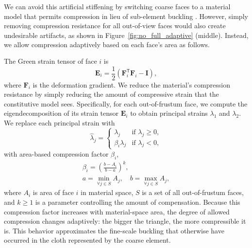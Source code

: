 \documentclass[10pt,journal,compsoc,twoside]{TexInputs/IEEEtran}
\begin{document}
We can avoid this artificial stiffening by switching coarse faces
to a material model that permits compression in lieu of sub-element buckling
\cite{Choi:2002:SBR,Wang:2010:MIS}.
However, simply removing compression resistance for all out-of-view faces would also create undesirable artifacts, as shown in Figure~\ref{fig:no_full_adaptive} (middle). Instead, we allow compression adaptively based on each face's
area as follows.

The Green strain tensor of face $i$ is
\begin{equation}
  \textbf{E}_i = \frac{1}{2}(\textbf{F}_i^\mathsf{T} \textbf{F}_i - \textbf{I}),
\end{equation}
where $\mathbf F_i$ is the deformation gradient.
We reduce the material's compression resistance by simply reducing the amount of compressive strain that the constitutive model sees. Specifically, for each out-of-frustum face, we compute the eigendecomposition of its strain tensor $\textbf{E}_i$ to obtain principal strains $\lambda_1$ and $\lambda_2$. We replace each principal strain with
\begin{equation}
  \hat\lambda_j =
  \begin{cases}
    \lambda_j & \text{if } \lambda_j \geq 0, \\
    \beta_i\lambda_j & \text{if } \lambda_j < 0,
  \end{cases}
\end{equation}
with area-based compression factor $\beta_i$,
\begin{gather}
  \beta_i = \left(\frac{b - A_i}{b - a}\right)^k, \\
  a = \min_{\forall j \in S} A_j,\quad b = \max_{\forall j \in S} A_j,
\end{gather}
where $A_i$ is area of face $i$ in material space, $S$ is a set of all out-of-frustum
faces, and $k\ge1$ is a parameter controlling the amount of compensation. Because this compression factor increases with material-space area, the degree of allowed compression changes adaptively: the bigger the triangle, the
more compressible it is.  This behavior approximates the fine-scale buckling that otherwise have occurred in the cloth represented by the coarse element.
\end{document}
